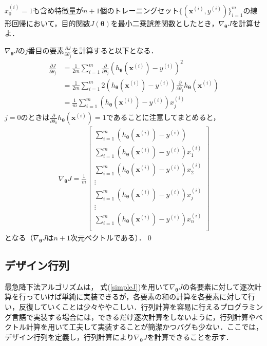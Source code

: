 \begin{qu}
$x_0^{(i)}=1$も含め特徴量が$n+1$個のトレーニングセット$\{({\bm x}^{(i)},y^{(i)})\}_{i=1}^m$の線形回帰において，目的関数$J({\bm \theta})$を最小二乗誤差関数としたとき，$\nabla_{{\bm \theta}}J$を計算せよ．
\end{qu}
\begin{ans}
$\nabla_{{\bm \theta}}J$の$j$番目の要素$\frac{\partial J}{\partial \theta_j}$を計算すると以下となる．
\begin{align*}
\frac{\partial J}{\partial \theta_j}&= \frac{1}{2m}\sum_{i=1}^m \frac{\partial }{\partial \theta_j}(h_{{\bm \theta}}({\bm x}^{(i)})-y^{(i)})^2 \\
&=\frac{1}{2m}\sum_{i=1}^m 2(h_{{\bm \theta}}({\bm x}^{(i)})-y^{(i)})\frac{\partial }{\partial \theta_j}h_{{\bm \theta}}({\bm x}^{(i)})\\
&= \frac{1}{m}\sum_{i=1}^m (h_{{\bm \theta}}({\bm x}^{(i)})-y^{(i)})x_j^{(i)}
\end{align*}
$j=0$のときは$\frac{\partial }{\partial \theta_0}h_{{\bm \theta}}({\bm x}^{(i)})=1$であることに注意してまとめると，
\begin{align}
\nabla_{{\bm \theta}}J =\frac{1}{m}
\begin{bmatrix}
\sum_{i=1}^m (h_{{\bm \theta}}({\bm x}^{(i)})-y^{(i)}) \\[3pt]
\sum_{i=1}^m (h_{{\bm \theta}}({\bm x}^{(i)})-y^{(i)})x_1^{(i)} \\[3pt]
\sum_{i=1}^m (h_{{\bm \theta}}({\bm x}^{(i)})-y^{(i)})x_2^{(i)} \\[3pt]
\vdots \\[3pt]
\sum_{i=1}^m (h_{{\bm \theta}}({\bm x}^{(i)})-y^{(i)})x_j^{(i)} \\[3pt]
\vdots \\[3pt]
\sum_{i=1}^m (h_{{\bm \theta}}({\bm x}^{(i)})-y^{(i)})x_n^{(i)} \\[3pt]
\end{bmatrix}\label{simpleJ}
\end{align}
となる（$\nabla_{{\bm \theta}}J$は$n+1$次元ベクトルである）．\qed
\end{ans}

\subsection{デザイン行列}

最急降下法アルゴリズムは， 式(\ref{simpleJ})を用いて$\nabla_{{\bm \theta}}J$の各要素に対して逐次計算を行っていけば単純に実装できるが，各要素の和の計算を各要素に対して行い，反復していくことは少々ややこしい．行列計算を容易に行えるプログラミング言語で実装する場合には，できるだけ逐次計算をしないように，行列計算やベクトル計算を用いて工夫して実装することが簡潔かつバグも少ない．ここでは，デザイン行列を定義し，行列計算により$\nabla_{{\bm \theta}}J$を計算できることを示す．

